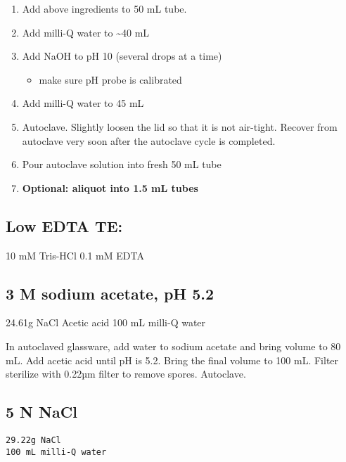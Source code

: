 \documentclass[
]{book}
\providecommand{\tightlist}{%
  \setlength{\itemsep}{0pt}\setlength{\parskip}{0pt}}
\begin{document}
\begin{enumerate}
\def\labelenumi{\arabic{enumi}.}
\tightlist
\item
  Add above ingredients to 50 mL tube.
\item
  Add milli-Q water to \textasciitilde40 mL
\item
  Add NaOH to pH 10 (several drops at a time)

  \begin{itemize}
  \tightlist
  \item
    make sure pH probe is calibrated
  \end{itemize}
\item
  Add milli-Q water to 45 mL
\item
  Autoclave. Slightly loosen the lid so that it is not air-tight. Recover from autoclave very soon after the autoclave cycle is completed.
\item
  Pour autoclave solution into fresh 50 mL tube
\item
  \textbf{Optional: aliquot into 1.5 mL tubes}
\end{enumerate}

\hypertarget{low-edta-te}{%
\subsection{Low EDTA TE:}\label{low-edta-te}}

10 mM Tris-HCl
0.1 mM EDTA

\hypertarget{m-sodium-acetate-ph-5.2}{%
\subsection{3 M sodium acetate, pH 5.2}\label{m-sodium-acetate-ph-5.2}}

24.61g NaCl
Acetic acid
100 mL milli-Q water

In autoclaved glassware, add water to sodium acetate and bring volume to 80 mL. Add acetic acid until pH is 5.2. Bring the final volume to 100 mL. Filter sterilize with 0.22µm filter to remove spores. Autoclave.

\hypertarget{n-nacl}{%
\subsection{5 N NaCl}\label{n-nacl}}

\begin{verbatim}
29.22g NaCl
100 mL milli-Q water
\end{verbatim}
\end{document}
